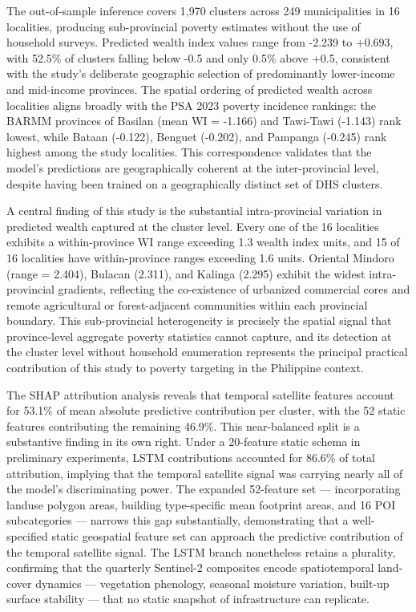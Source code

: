 \documentclass[12pt, letterpaper]{article}
\numberwithin{figure}{section}
\numberwithin{table}{section}
\begin{document}
The out-of-sample inference covers 1,970 clusters across 249
municipalities in 16 localities, producing sub-provincial poverty
estimates without the use of household surveys. Predicted wealth
index values range from -2.239 to +0.693, with 52.5\% of clusters
falling below -0.5 and only 0.5\% above +0.5, consistent with the
study's deliberate geographic selection of predominantly lower-income
and mid-income provinces. The spatial ordering of predicted wealth
across localities aligns broadly with the PSA 2023 poverty incidence
rankings: the BARMM provinces of Basilan (mean WI = -1.166) and
Tawi-Tawi (-1.143) rank lowest, while Bataan (-0.122), Benguet
(-0.202), and Pampanga (-0.245) rank highest among the study
localities. This correspondence validates that the model's
predictions are geographically coherent at the inter-provincial
level, despite having been trained on a geographically distinct set
of DHS clusters.

A central finding of this study is the substantial intra-provincial
variation in predicted wealth captured at the cluster level. Every
one of the 16 localities exhibits a within-province WI range
exceeding 1.3 wealth index units, and 15 of 16 localities have
within-province ranges exceeding 1.6 units. Oriental Mindoro (range =
2.404), Bulacan (2.311), and Kalinga (2.295) exhibit the widest
intra-provincial gradients, reflecting the co-existence of urbanized
commercial cores and remote agricultural or forest-adjacent
communities within each provincial boundary. This sub-provincial
heterogeneity is precisely the spatial signal that province-level
aggregate poverty statistics cannot capture, and its detection at the
cluster level without household enumeration represents the principal
practical contribution of this study to poverty targeting in the
Philippine context.

The SHAP attribution analysis reveals that temporal satellite
features account for 53.1\% of mean absolute predictive contribution
per cluster, with the 52 static features contributing the remaining
46.9\%. This near-balanced split is a substantive finding in its own
right. Under a 20-feature static schema in preliminary experiments,
LSTM contributions accounted for 86.6\% of total attribution,
implying that the temporal satellite signal was carrying nearly all
of the model's discriminating power. The expanded 52-feature set —
incorporating landuse polygon areas, building type-specific mean
footprint areas, and 16 POI subcategories — narrows this gap
substantially, demonstrating that a well-specified static geospatial
feature set can approach the predictive contribution of the temporal
satellite signal. The LSTM branch nonetheless retains a plurality,
confirming that the quarterly Sentinel-2 composites encode
spatiotemporal land-cover dynamics — vegetation phenology, seasonal
moisture variation, built-up surface stability — that no static
snapshot of infrastructure can replicate.
\end{document}
